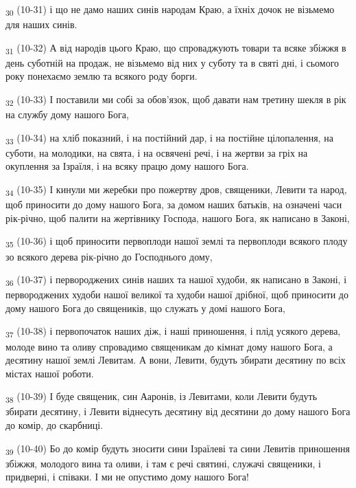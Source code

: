 \begin{tcolorbox}
\textsubscript{30} (10-31) і що не дамо наших синів народам Краю, а їхніх дочок не візьмемо для наших синів.
\end{tcolorbox}
\begin{tcolorbox}
\textsubscript{31} (10-32) А від народів цього Краю, що спроваджують товари та всяке збіжжя в день суботній на продаж, не візьмемо від них у суботу та в святі дні, і сьомого року понехаємо землю та всякого роду борги.
\end{tcolorbox}
\begin{tcolorbox}
\textsubscript{32} (10-33) І поставили ми собі за обов'язок, щоб давати нам третину шекля в рік на службу дому нашого Бога,
\end{tcolorbox}
\begin{tcolorbox}
\textsubscript{33} (10-34) на хліб показний, і на постійний дар, і на постійне цілопалення, на суботи, на молодики, на свята, і на освячені речі, і на жертви за гріх на окуплення за Ізраїля, і на всяку працю дому нашого Бога.
\end{tcolorbox}
\begin{tcolorbox}
\textsubscript{34} (10-35) І кинули ми жеребки про пожертву дров, священики, Левити та народ, щоб приносити до дому нашого Бога, за домом наших батьків, на означені часи рік-річно, щоб палити на жертівнику Господа, нашого Бога, як написано в Законі,
\end{tcolorbox}
\begin{tcolorbox}
\textsubscript{35} (10-36) і щоб приносити первоплоди нашої землі та первоплоди всякого плоду зо всякого дерева рік-річно до Господнього дому,
\end{tcolorbox}
\begin{tcolorbox}
\textsubscript{36} (10-37) і первороджених синів наших та нашої худоби, як написано в Законі, і первороджених худоби нашої великої та худоби нашої дрібної, щоб приносити до дому нашого Бога до священиків, що служать у домі нашого Бога,
\end{tcolorbox}
\begin{tcolorbox}
\textsubscript{37} (10-38) і первопочаток наших діж, і наші приношення, і плід усякого дерева, молоде вино та оливу спровадимо священикам до кімнат дому нашого Бога, а десятину нашої землі Левитам. А вони, Левити, будуть збирати десятину по всіх містах нашої роботи.
\end{tcolorbox}
\begin{tcolorbox}
\textsubscript{38} (10-39) І буде священик, син Ааронів, із Левитами, коли Левити будуть збирати десятину, і Левити віднесуть десятину від десятини до дому нашого Бога до комір, до скарбниці.
\end{tcolorbox}
\begin{tcolorbox}
\textsubscript{39} (10-40) Бо до комір будуть зносити сини Ізраїлеві та сини Левитів приношення збіжжя, молодого вина та оливи, і там є речі святині, служачі священики, і придверні, і співаки. І ми не опустимо дому нашого Бога!
\end{tcolorbox}

